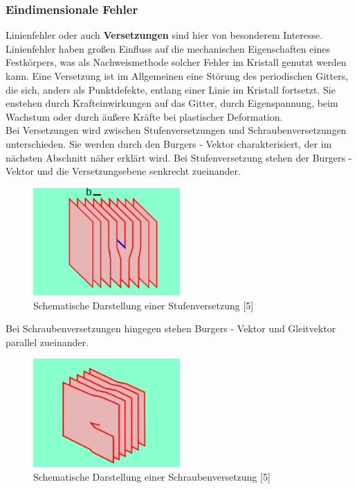         \subsubsection*{Eindimensionale Fehler}
            Linienfehler oder auch \textbf{Versetzungen} sind hier von besonderem Interesse. Linienfehler haben 
            großen Einfluss auf die mechanischen Eigenschaften eines Festkörpers, was
            als Nachweismethode solcher Fehler im Kristall genutzt werden kann. Eine Versetzung ist im Allgemeinen eine Störung des periodischen Gitters, 
            die sich, anders als Punktdefekte, entlang einer Linie im Kristall fortsetzt. Sie enstehen durch Krafteinwirkungen auf das Gitter,
            durch Eigenspannung, beim Wachstum oder durch äußere Kräfte bei plastischer Deformation.\\
            Bei Versetzungen wird zwischen Stufenversetzungen und Schraubenversetzungen unterschieden.
            Sie werden durch den Burgers - Vektor charakterisiert, der im nächsten Abschnitt näher erklärt wird.
            Bei Stufenversetzung stehen der Burgers - Vektor und die Versetzungsebene senkrecht zueinander.
            \begin{figure}[H]
                \centering
                \includegraphics[width=0.5\textwidth]{Images/Stufenversetzung.png}
                \caption{Schematische Darstellung einer Stufenversetzung [5]}
            \end{figure}
            Bei Schraubenversetzungen hingegen stehen Burgers - Vektor und Gleitvektor parallel zueinander.
            \begin{figure}[H]
                \centering
                \includegraphics[width=0.5\textwidth]{Images/Schraubenversetzung.png}
                \caption{Schematische Darstellung einer Schraubenversetzung [5]}
            \end{figure}
